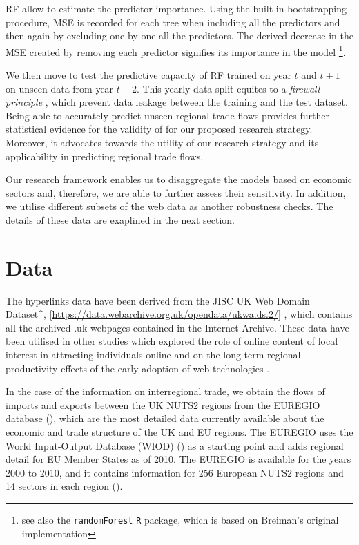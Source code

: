 \documentclass[sigconf]{acmart}
\begin{document}
RF allow to estimate the predictor importance. Using the built-in
bootstrapping procedure, MSE is recorded for each tree when including
all the predictors and then again by excluding one by one all the
predictors. The derived decrease in the MSE created by removing each
predictor signifies its importance in the model
\citep{breiman2001random}\footnote{see also the \texttt{randomForest}
	\texttt{R} package, which is based on Breiman's
	\citeyearpar{breiman2001random} original implementation}.

We then move to test the predictive capacity of RF trained on year \(t\)
and \(t + 1\) on unseen data from year \(t + 2\). This yearly data split
equites to a \emph{firewall principle} \citep{mullainathan2017machine},
which prevent data leakage between the training and the test dataset.
Being able to accurately predict unseen regional trade flows provides
further statistical evidence for the validity of for our proposed
research strategy. Moreover, it advocates towards the utility of our
research strategy and its applicability in predicting regional trade
flows.

Our research framework enables us to disaggregate the models based on
economic sectors and, therefore, we are able to further assess their
sensitivity. In addition, we utilise different subsets of the web data
as another robustness checks. The details of these data are exaplined in
the next section.

\hypertarget{sec:4}{%
	\section{Data}\label{sec:4}}

The hyperlinks data have been derived from the JISC UK Web Domain
Dataset\^{},
{[}\url{https://data.webarchive.org.uk/opendata/ukwa.ds.2/}{]}
\citep{ukwebarchive}, which contains all the archived .uk webpages
contained in the Internet Archive. These data have been utilised in
other studies which explored the role of online content of local
interest in attracting individuals online \citep{tranos2020individual}
and on the long term regional productivity effects of the early adoption
of web technologies \citep{tranos2020digital}.

In the case of the information on interregional trade, we obtain the
flows of imports and exports between the UK NUTS2 regions from the
EUREGIO database (\citet{thissen2018euregio}), which are the most
detailed data currently available about the economic and trade structure
of the UK and EU regions. The EUREGIO uses the World Input-Output
Database (WIOD) (\citet{timmer2015illustrated}) as a starting point and
adds regional detail for EU Member States as of 2010. The EUREGIO is
available for the years 2000 to 2010, and it contains information for
256 European NUTS2 regions and 14 sectors in each region
(\citet{ijtsma2020uk}).
\end{document}
